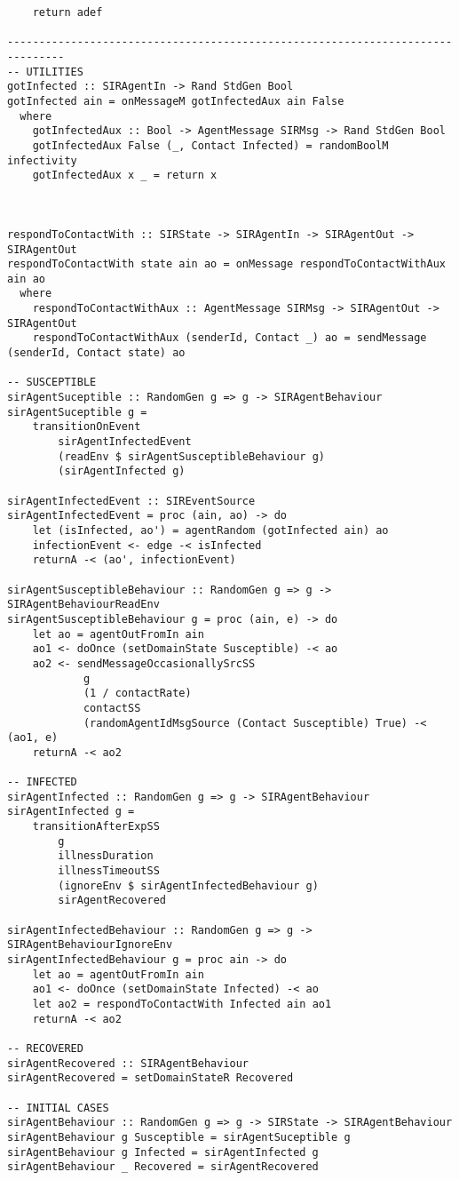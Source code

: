 \begin{verbatim}
    return adef
   
-------------------------------------------------------------------------------
-- UTILITIES
gotInfected :: SIRAgentIn -> Rand StdGen Bool
gotInfected ain = onMessageM gotInfectedAux ain False
  where
    gotInfectedAux :: Bool -> AgentMessage SIRMsg -> Rand StdGen Bool
    gotInfectedAux False (_, Contact Infected) = randomBoolM infectivity
    gotInfectedAux x _ = return x



respondToContactWith :: SIRState -> SIRAgentIn -> SIRAgentOut -> SIRAgentOut
respondToContactWith state ain ao = onMessage respondToContactWithAux ain ao
  where
    respondToContactWithAux :: AgentMessage SIRMsg -> SIRAgentOut -> SIRAgentOut
    respondToContactWithAux (senderId, Contact _) ao = sendMessage (senderId, Contact state) ao

-- SUSCEPTIBLE
sirAgentSuceptible :: RandomGen g => g -> SIRAgentBehaviour
sirAgentSuceptible g = 
	transitionOnEvent 
		sirAgentInfectedEvent 
		(readEnv $ sirAgentSusceptibleBehaviour g) 
		(sirAgentInfected g)

sirAgentInfectedEvent :: SIREventSource
sirAgentInfectedEvent = proc (ain, ao) -> do
    let (isInfected, ao') = agentRandom (gotInfected ain) ao
    infectionEvent <- edge -< isInfected
    returnA -< (ao', infectionEvent)

sirAgentSusceptibleBehaviour :: RandomGen g => g -> SIRAgentBehaviourReadEnv
sirAgentSusceptibleBehaviour g = proc (ain, e) -> do
    let ao = agentOutFromIn ain
    ao1 <- doOnce (setDomainState Susceptible) -< ao
    ao2 <- sendMessageOccasionallySrcSS 
    		g
    		(1 / contactRate)
    		contactSS
    		(randomAgentIdMsgSource (Contact Susceptible) True) -< (ao1, e)
    returnA -< ao2

-- INFECTED
sirAgentInfected :: RandomGen g => g -> SIRAgentBehaviour
sirAgentInfected g = 
	transitionAfterExpSS 
		g 
		illnessDuration 
		illnessTimeoutSS 
		(ignoreEnv $ sirAgentInfectedBehaviour g) 
		sirAgentRecovered

sirAgentInfectedBehaviour :: RandomGen g => g -> SIRAgentBehaviourIgnoreEnv
sirAgentInfectedBehaviour g = proc ain -> do
    let ao = agentOutFromIn ain
    ao1 <- doOnce (setDomainState Infected) -< ao
    let ao2 = respondToContactWith Infected ain ao1
    returnA -< ao2

-- RECOVERED
sirAgentRecovered :: SIRAgentBehaviour
sirAgentRecovered = setDomainStateR Recovered

-- INITIAL CASES
sirAgentBehaviour :: RandomGen g => g -> SIRState -> SIRAgentBehaviour
sirAgentBehaviour g Susceptible = sirAgentSuceptible g
sirAgentBehaviour g Infected = sirAgentInfected g
sirAgentBehaviour _ Recovered = sirAgentRecovered


\end{verbatim}

